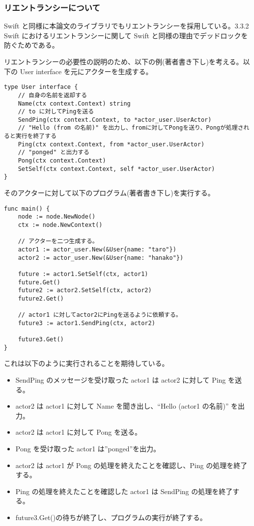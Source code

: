 \subsubsection{リエントランシーについて}

Swift
と同様に本論文のライブラリでもリエントランシーを採用している。3.3.2
Swift におけるリエントランシーに関して Swift
と同様の理由でデッドロックを防ぐためである。

リエントランシーの必要性の説明のため、以下の例(著者書き下し)を考える。以下の
User interface を元にアクターを生成する。

\begin{verbatim}
type User interface {
    // 自身の名前を返却する
    Name(ctx context.Context) string
    // to に対してPingを送る
    SendPing(ctx context.Context, to *actor_user.UserActor)
    // "Hello (from の名前)" を出力し、fromに対してPongを送り、Pongが処理されると実行を終了する
    Ping(ctx context.Context, from *actor_user.UserActor)
    // "ponged" と出力する
    Pong(ctx context.Context)
    SetSelf(ctx context.Context, self *actor_user.UserActor)
}
\end{verbatim}

そのアクターに対して以下のプログラム(著者書き下し)を実行する。

\begin{verbatim}
func main() {
    node := node.NewNode()
    ctx := node.NewContext()

    // アクターを二つ生成する。
    actor1 := actor_user.New(&User{name: "taro"})
    actor2 := actor_user.New(&User{name: "hanako"})

    future := actor1.SetSelf(ctx, actor1)
    future.Get()
    future2 := actor2.SetSelf(ctx, actor2)
    future2.Get()

    // actor1 に対してactor2にPingを送るように依頼する。
    future3 := actor1.SendPing(ctx, actor2)

    future3.Get()
}
\end{verbatim}

これは以下のように実行されることを期待している。

\begin{itemize}
\item
  SendPing のメッセージを受け取った actor1 は actor2 に対して Ping
  を送る。
\item
  actor2 は actor1 に対して Name を聞き出し、``Hello (actor1 の名前)''
  を出力。
\item
  actor2 は actor1 に対して Pong を送る。
\item
  Pong を受け取った actor1 は''ponged''を出力。
\item
  actor2 は actor1 が Pong の処理を終えたことを確認し、Ping
  の処理を終了する。
\item
  Ping の処理を終えたことを確認した actor1 は SendPing
  の処理を終了する。
\item
  future3.Get()の待ちが終了し、プログラムの実行が終了する。
\end{itemize}


